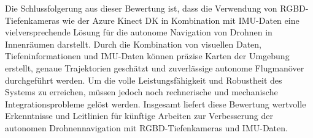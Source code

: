 Die Schlussfolgerung aus dieser Bewertung ist, dass die Verwendung von RGBD-Tiefenkameras wie der Azure Kinect DK in Kombination mit IMU-Daten eine vielversprechende Lösung für die autonome Navigation von Drohnen in Innenräumen darstellt. Durch die Kombination von visuellen Daten, Tiefeninformationen und IMU-Daten können präzise Karten der Umgebung erstellt, genaue Trajektorien geschätzt und zuverlässige autonome Flugmanöver durchgeführt werden. Um die volle Leistungsfähigkeit und Robustheit des Systems zu erreichen, müssen jedoch noch rechnerische und mechanische Integrationsprobleme gelöst werden. Insgesamt liefert diese Bewertung wertvolle Erkenntnisse und Leitlinien für künftige Arbeiten zur Verbesserung der autonomen Drohnennavigation mit RGBD-Tiefenkameras und IMU-Daten.




